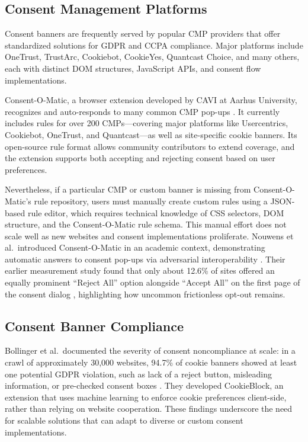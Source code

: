 \documentclass[conference]{IEEEtran}
\begin{document}
\subsection{Consent Management Platforms}

Consent banners are frequently served by popular CMP providers that offer standardized solutions for GDPR and CCPA compliance. Major platforms include OneTrust, TrustArc, Cookiebot, CookieYes, Quantcast Choice, and many others, each with distinct DOM structures, JavaScript APIs, and consent flow implementations.

Consent-O-Matic, a browser extension developed by CAVI at Aarhus University, recognizes and auto-responds to many common CMP pop-ups \cite{consentomatic}. It currently includes rules for over 200 CMPs—covering major platforms like Usercentrics, Cookiebot, OneTrust, and Quantcast—as well as site-specific cookie banners. Its open-source rule format allows community contributors to extend coverage, and the extension supports both accepting and rejecting consent based on user preferences.

Nevertheless, if a particular CMP or custom banner is missing from Consent-O-Matic's rule repository, users must manually create custom rules using a JSON-based rule editor, which requires technical knowledge of CSS selectors, DOM structure, and the Consent-O-Matic rule schema. This manual effort does not scale well as new websites and consent implementations proliferate. Nouwens et al.\ introduced Consent-O-Matic in an academic context, demonstrating automatic answers to consent pop-ups via adversarial interoperability \cite{nouwens2022}. Their earlier measurement study found that only about 12.6\% of sites offered an equally prominent ``Reject All'' option alongside ``Accept All'' on the first page of the consent dialog \cite{nouwens2020}, highlighting how uncommon frictionless opt-out remains.

\subsection{Consent Banner Compliance}

Bollinger et al.\ documented the severity of consent noncompliance at scale: in a crawl of approximately 30,000 websites, 94.7\% of cookie banners showed at least one potential GDPR violation, such as lack of a reject button, misleading information, or pre-checked consent boxes \cite{bollinger2022}. They developed CookieBlock, an extension that uses machine learning to enforce cookie preferences client-side, rather than relying on website cooperation. These findings underscore the need for scalable solutions that can adapt to diverse or custom consent implementations.
\end{document}
